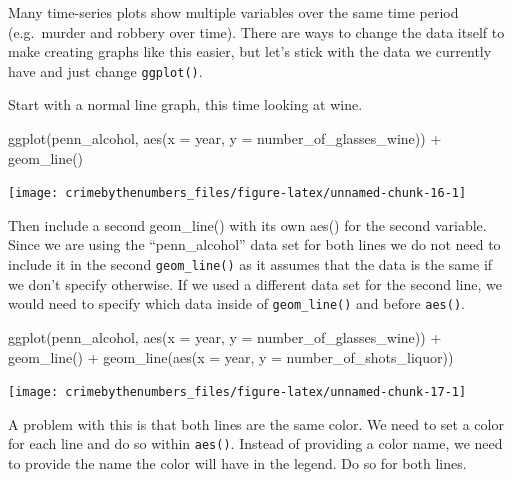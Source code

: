 \documentclass[
]{krantz}
\makeatletter
\newenvironment{Shaded}{\begin{snugshade}}{\end{snugshade}}
\newcommand{\AttributeTok}[1]{\textcolor[rgb]{0.61,0.61,0.61}{#1}}
\newcommand{\FunctionTok}[1]{\textcolor[rgb]{0,0,0}{#1}}
\newcommand{\NormalTok}[1]{#1}
\newcommand{\SpecialCharTok}[1]{\textcolor[rgb]{0,0,0}{#1}}
\newenvironment{kframe}{%
\medskip{}
\setlength{\fboxsep}{.8em}
 \def\at@end@of@kframe{}%
 \ifinner\ifhmode%
  \def\at@end@of@kframe{\end{minipage}}%
  \begin{minipage}{\columnwidth}%
 \fi\fi%
 \def\FrameCommand##1{\hskip\@totalleftmargin \hskip-\fboxsep
 \colorbox{shadecolor}{##1}\hskip-\fboxsep
     \hskip-\linewidth \hskip-\@totalleftmargin \hskip\columnwidth}%
 \MakeFramed {\advance\hsize-\width
   \@totalleftmargin\z@ \linewidth\hsize
   \@setminipage}}%
 {\par\unskip\endMakeFramed%
 \at@end@of@kframe}
\renewenvironment{Shaded}{\begin{kframe}}{\end{kframe}}
\makeatother
\begin{document}
Many time-series plots show multiple variables over the same time period (e.g.~murder and robbery over time). There are ways to change the data itself to make creating graphs like this easier, but let's stick with the data we currently have and just change \texttt{ggplot()}.

Start with a normal line graph, this time looking at wine.

\begin{Shaded}
\begin{Highlighting}[]
\FunctionTok{ggplot}\NormalTok{(penn\_alcohol, }\FunctionTok{aes}\NormalTok{(}\AttributeTok{x =}\NormalTok{ year, }\AttributeTok{y =}\NormalTok{ number\_of\_glasses\_wine)) }\SpecialCharTok{+}
  \FunctionTok{geom\_line}\NormalTok{()}
\end{Highlighting}
\end{Shaded}

\begin{center}\texttt{[image: crimebythenumbers\_files/figure-latex/unnamed-chunk-16-1]} \end{center}

Then include a second geom\_line() with its own aes() for the second variable. Since we are using the ``penn\_alcohol'' data set for both lines we do not need to include it in the second \texttt{geom\_line()} as it assumes that the data is the same if we don't specify otherwise. If we used a different data set for the second line, we would need to specify which data inside of \texttt{geom\_line()} and before \texttt{aes()}.

\begin{Shaded}
\begin{Highlighting}[]
\FunctionTok{ggplot}\NormalTok{(penn\_alcohol, }\FunctionTok{aes}\NormalTok{(}\AttributeTok{x =}\NormalTok{ year, }\AttributeTok{y =}\NormalTok{ number\_of\_glasses\_wine)) }\SpecialCharTok{+}
  \FunctionTok{geom\_line}\NormalTok{() }\SpecialCharTok{+}
  \FunctionTok{geom\_line}\NormalTok{(}\FunctionTok{aes}\NormalTok{(}\AttributeTok{x =}\NormalTok{ year, }\AttributeTok{y =}\NormalTok{ number\_of\_shots\_liquor))}
\end{Highlighting}
\end{Shaded}

\begin{center}\texttt{[image: crimebythenumbers\_files/figure-latex/unnamed-chunk-17-1]} \end{center}

A problem with this is that both lines are the same color. We need to set a color for each line and do so within \texttt{aes()}. Instead of providing a color name, we need to provide the name the color will have in the legend. Do so for both lines.
\end{document}
